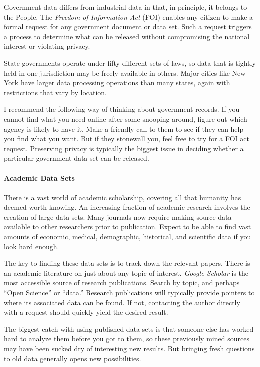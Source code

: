 \documentclass[10pt]{article}
\begin{document}
Government data differs from industrial data in that, in principle, it belongs to the People. The \textit{Freedom of Information Act} (FOI) enables any citizen to make a formal request for any government document or data set. Such a request triggers a process to determine what can be released without compromising the national interest or violating privacy.

State governments operate under fifty different sets of laws, so data that is tightly held in one jurisdiction may be freely available in others. Major cities like New York have larger data processing operations than many states, again with restrictions that vary by location.

I recommend the following way of thinking about government records. If you cannot find what you need online after some snooping around, figure out which agency is likely to have it. Make a friendly call to them to see if they can help you find what you want. But if they stonewall you, feel free to try for a FOI act request. Preserving privacy is typically the biggest issue in deciding whether a particular government data set can be released.

\paragraph{Academic Data Sets}
There is a vast world of academic scholarship, covering all that humanity has deemed worth knowing. An increasing fraction of academic research involves the creation of large data sets. Many journals now require making source data available to other researchers prior to publication. Expect to be able to find vast amounts of economic, medical, demographic, historical, and scientific data if you look hard enough.

The key to finding these data sets is to track down the relevant papers. There is an academic literature on just about any topic of interest. \textit{Google Scholar} is the most accessible source of research publications. Search by topic, and perhaps “Open Science” or “data.” Research publications will typically provide pointers to where its associated data can be found. If not, contacting the author directly with a request should quickly yield the desired result.

The biggest catch with using published data sets is that someone else has worked hard to analyze them before you got to them, so these previously mined sources may have been sucked dry of interesting new results. But bringing fresh questions to old data generally opens new possibilities.
\end{document}
